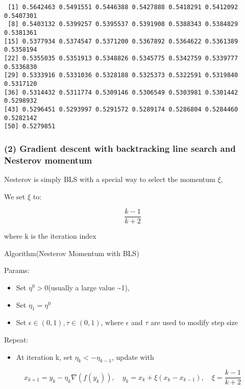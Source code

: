 \documentclass[
  letterpaper,
  DIV=11,
  numbers=noendperiod]{scrartcl}
\providecommand{\tightlist}{%
  \setlength{\itemsep}{0pt}\setlength{\parskip}{0pt}}\usepackage{longtable,booktabs,array}
\begin{document}
\begin{verbatim}
 [1] 0.5642463 0.5491551 0.5446388 0.5427888 0.5418291 0.5412092 0.5407301
 [8] 0.5403132 0.5399257 0.5395537 0.5391908 0.5388343 0.5384829 0.5381361
[15] 0.5377934 0.5374547 0.5371200 0.5367892 0.5364622 0.5361389 0.5358194
[22] 0.5355035 0.5351913 0.5348826 0.5345775 0.5342759 0.5339777 0.5336830
[29] 0.5333916 0.5331036 0.5328188 0.5325373 0.5322591 0.5319840 0.5317120
[36] 0.5314432 0.5311774 0.5309146 0.5306549 0.5303981 0.5301442 0.5298932
[43] 0.5296451 0.5293997 0.5291572 0.5289174 0.5286804 0.5284460 0.5282142
[50] 0.5279851
\end{verbatim}

\subsubsection{(2) Gradient descent with backtracking line search and
Nesterov
momentum}\label{gradient-descent-with-backtracking-line-search-and-nesterov-momentum}

Nesterov is simply BLS with a special way to select the momentum
\(\xi\),

We set \(\xi\) to:

\[
\frac{k-1}{k+2}
\]

where k is the iteration index

Algorithm(Nesterov Momentum with BLS)

Params:

\begin{itemize}
\tightlist
\item
  Set \(η^0 > 0\)(usually a large value \textasciitilde1),
\item
  Set \(η_1 = η^0\)
\item
  Set \(ϵ ∈ (0,1), τ ∈ (0,1)\), where \(ϵ\) and \(τ\) are used to modify
  step size
\end{itemize}

Repeat:

\begin{itemize}
\tightlist
\item
  At iteration k, set \(η_k <- η_{k-1}\), update with
\end{itemize}

\[
\boxed{x_{k+1} = y_k - \eta_k \nabla (f(y_k)), \quad y_k = x_k + \xi(x_k - x_{k-1}), \quad \xi = \frac{k-1}{k+2}}
\]
\end{document}

